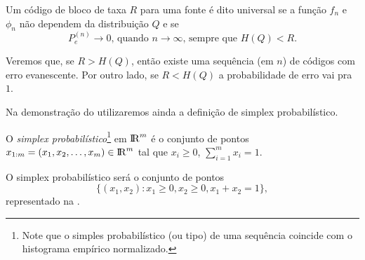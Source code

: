 \begin{definition}
  Um código de bloco de taxa $R$ para uma fonte é dito universal se a função $f_n$ e $\phi_n$
  não dependem da distribuição $Q$ e se
  \begin{equation}
    P_e^{(n)} \rightarrow 0 \text{, quando } n \rightarrow \infty \text{, sempre que } H(Q) < R .
  \end{equation}
\end{definition}

Veremos que, se $R > H(Q)$, então existe uma sequência (em $n$) de códigos com erro evanescente.
Por outro lado, se $R < H(Q)$ a probabilidade de erro vai pra $1$.

Na demonstração do  utilizaremos ainda a definição de simplex probabilístico.
\begin{definition}
  O \emph{simplex probabilístico}\footnote{Note que o simples probabilístico
  (ou tipo) de uma sequência coincide com o histograma empírico normalizado.}
  em ${\rm I\!R}^m$ é o conjunto de pontos
  $x_{1:m} = (x_1, x_2, \ldots, x_m) \in {\rm I\!R}^m$ tal que $x_i \geq 0$, $\sum_{i=1}^{m} x_i = 1$.
\end{definition}

\begin{example}[Simplex probabilístico com $m=2$]
  O simplex probabilístico será o conjunto de pontos
  \begin{equation}
  \{ (x_1, x_2)  :  x_1 \geq 0 , x_2 \geq 0 , x_1 + x_2 = 1 \} ,
  \end{equation}
  representado na .
    \begin{marginfigure}
    \centering
    \caption{Simplex probabilístico para $m=2$.}
    \label{fig:prob-simplex-2}
    \end{marginfigure}
\end{example}

